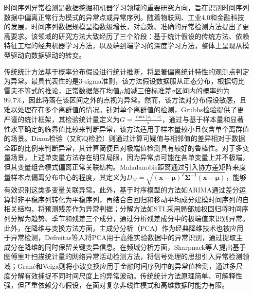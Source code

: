 时间序列异常检测是数据挖掘和机器学习领域的重要研究方向，旨在识别时间序列数据中偏离正常行为模式的异常点或异常序列。随着物联网、工业4.0和金融科技的发展，时间序列数据规模呈指数级增长，对高效、准确的异常检测方法提出了更高要求。该领域的研究方法大致经历了三个阶段：基于统计假设的传统方法、依赖特征工程的经典机器学习方法，以及端到端学习的深度学习方法，整体上呈现从模型驱动向数据驱动的转变。

传统统计方法基于概率分布假设进行统计推断，将显著偏离统计特性的观测点判定为异常。最具代表性的是3-sigma准则，该方法假设数据服从正态分布，根据切比雪夫不等式的推论，正常数据落在均值$\mu$加减三倍标准差$\sigma$区间内的概率约为99.7\%，因此将落在该区间之外的点视为异常。然而，该方法对分布假设敏感，且难以处理存在多个离群值的情况。针对单个离群值的检测，Grubbs检验\cite{grubbs1969}提供了更严谨的统计框架，其检验统计量定义为$G = \frac{\max|x_i - \bar{x}|}{s}$，通过与基于样本量和显著性水平确定的临界值比较来判断异常，该方法适用于样本量较小且仅含单个离群值的场景。Dixon检验\cite{dixon1950}（又称Q检验）则通过计算可疑值与相邻值的差异相对于数据全距的比例来判断异常，其计算简便且对极端值检测具有较好的鲁棒性。对于多变量场景，上述单变量方法存在明显局限，因为异常点可能在各单变量上并不极端，但其变量组合模式偏离正常关联结构。Mahalanobis距离\cite{mahalanobis1936}通过引入协方差矩阵来度量样本点偏离分布中心的程度，其定义为$D_M = \sqrt{(\mathbf{x}-\boldsymbol{\mu})^T \boldsymbol{\Sigma}^{-1} (\mathbf{x}-\boldsymbol{\mu})}$，能够有效识别这类多变量关联异常。此外，基于时序模型的方法如ARIMA\cite{box1970arima}通过差分运算将非平稳序列转化为平稳序列，再结合自回归和移动平均成分建模时间序列的自相关结构，将预测残差作为异常判据；分解方法如STL\cite{cleveland1990stl}采用局部加权回归将时间序列分解为趋势、季节和残差三个成分，通过分析残差成分中的极端值来识别异常。此外，在降维与变换方法方面，主成分分析（PCA）作为经典降维技术也被应用于异常检测，Defreitas等人\cite{defreitas2022pca}将PCA用于高维实验数据中的异常识别，通过提取主成分在降维的同时保留关键变异信息。在频域分析方面，Sharpnack等人\cite{sharpnack2015fourier}提出基于图傅里叶扫描统计量的网络异常活动检测方法，将信号处理的思想引入异常检测领域；Gran\'{e}和Veiga\cite{grane2010wavelet}则将小波变换应用于金融时间序列中的异常值检测，通过多尺度分解有效捕捉不同时间尺度上的异常波动。传统统计方法原理简单、可解释性强，但严重依赖分布假设，在面对复杂非线性模式和高维数据时能力有限。

